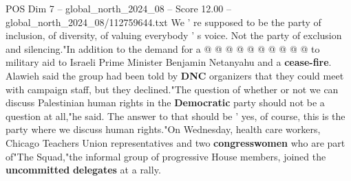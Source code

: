 \begin{textsample}{POS Dim 7 – global\_north\_2024\_08 – Score 12.00 – global\_north\_2024\_08/112759644.txt}
We ' re supposed to be the party of inclusion, of diversity, of valuing everybody ' s voice.
Not the party of exclusion and silencing."In addition to the demand for a @ @ @ @ @ @ @ @ @ @ to military aid to Israeli Prime Minister Benjamin Netanyahu and a \textbf{cease-fire}.
Alawieh said the group had been told by \textbf{DNC} organizers that they could meet with campaign staff, but they declined."The question of whether or not we can discuss Palestinian human rights in the \textbf{Democratic} party should not be a question at all,"he said.
The answer to that should be ' yes, of course, this is the party where we discuss human rights."On Wednesday, health care workers, Chicago Teachers Union representatives and two \textbf{congresswomen} who are part of"The Squad,"the informal group of progressive House members, joined the \textbf{uncommitted} \textbf{delegates} at a rally.

\end{textsample}
